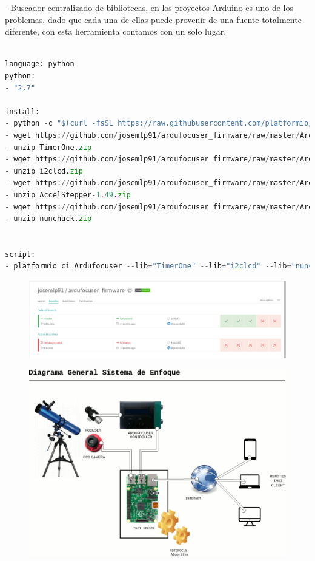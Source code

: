 - Buscador centralizado de bibliotecas, en los proyectos Arduino es uno de los problemas, dado que cada una de ellas puede provenir de una fuente totalmente diferente, con esta herramienta contamos con un solo lugar.

 
 
\newpage
\begin{lstlisting}[language=python, caption={Script travis para realizar integración continua},label={lst:write_read_serial_port_sample}]

language: python
python:
- "2.7"

install:
- python -c "$(curl -fsSL https://raw.githubusercontent.com/platformio/platformio/master/scripts/get-platformio.py)"
- wget https://github.com/josemlp91/ardufocuser_firmware/raw/master/Ardufocuser/libs/TimerOne.zip
- unzip TimerOne.zip
- wget https://github.com/josemlp91/ardufocuser_firmware/raw/master/Ardufocuser/libs/i2clcd.zip
- unzip i2clcd.zip
- wget https://github.com/josemlp91/ardufocuser_firmware/raw/master/Ardufocuser/libs/AccelStepper-1.49.zip
- unzip AccelStepper-1.49.zip
- wget https://github.com/josemlp91/ardufocuser_firmware/raw/master/Ardufocuser/libs/nunchuck.zip
- unzip nunchuck.zip


script:
- platformio ci Ardufocuser --lib="TimerOne" --lib="i2clcd" --lib="nunchuck" --lib="AccelStepper" --board=uno

\end{lstlisting}


\begin{figure}[h]
\centering
\includegraphics[width=1\linewidth]{../images/travis_ci}
\caption{}
\label{fig:travis_ci}
\end{figure}




\begin{figure}[h]
	\centering
	\includegraphics[width=0.7\linewidth]{../images/diagramaGeneral}
	\caption{}
	\label{fig:diagramaHardware}
\end{figure}


